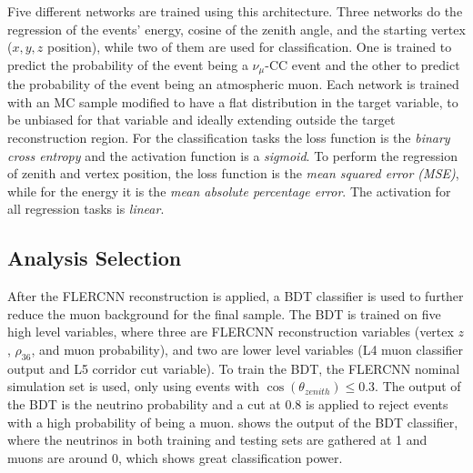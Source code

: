 Five different networks are trained using this architecture. Three networks do the regression of the events' energy, cosine of the zenith angle, and the starting vertex ($x,y,z$ position), while two of them are used for classification. One is trained to predict the probability of the event being a $\nu_\mu$-CC event and the other to predict the probability of the event being an atmospheric muon. Each network is trained with an MC sample modified to have a flat distribution in the target variable, to be unbiased for that variable and ideally extending outside the target reconstruction region. For the classification tasks the loss function is the \textit{binary cross entropy} and the activation function is a \textit{sigmoid}. To perform the regression of zenith and vertex position, the loss function is the \textit{mean squared error (MSE)}, while for the energy it is the \textit{mean absolute percentage error}. The activation for all regression tasks is \textit{linear}.




\subsection{Analysis Selection} 

After the FLERCNN reconstruction is applied, a BDT classifier is used to further reduce the muon background for the final sample. The BDT is trained on five high level variables, where three are FLERCNN reconstruction variables (vertex $z$, $\rho_{36}$, and muon probability), and two are lower level variables (L4 muon classifier output and L5 corridor cut variable). To train the BDT, the FLERCNN nominal simulation set is used, only using events with $\cos(\theta_{zenith})\leq 0.3$. The output of the BDT is the neutrino probability and a cut at 0.8 is applied to reject events with a high probability of being a muon.  shows the output of the BDT classifier, where the neutrinos in both training and testing sets are gathered at 1 and muons are around 0, which shows great classification power.

